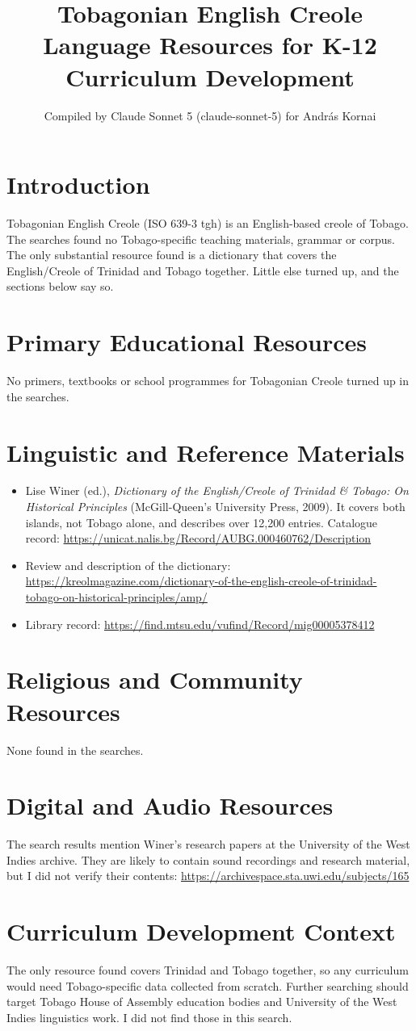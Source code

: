 \documentclass[12pt]{article}
\title{Tobagonian English Creole Language Resources for K-12 Curriculum Development}
\author{Compiled by Claude Sonnet 5 (claude-sonnet-5) for Andr\'as Kornai}
\date{}
\begin{document}
\maketitle

\section{Introduction}
Tobagonian English Creole (ISO 639-3 tgh) is an English-based creole of Tobago. The searches found no Tobago-specific teaching materials, grammar or corpus. The only substantial resource found is a dictionary that covers the English/Creole of Trinidad and Tobago together. Little else turned up, and the sections below say so.

\section{Primary Educational Resources}
No primers, textbooks or school programmes for Tobagonian Creole turned up in the searches.

\section{Linguistic and Reference Materials}
\begin{itemize}
\item Lise Winer (ed.), \emph{Dictionary of the English/Creole of Trinidad \& Tobago: On Historical Principles} (McGill-Queen's University Press, 2009). It covers both islands, not Tobago alone, and describes over 12,200 entries. Catalogue record: \url{https://unicat.nalis.bg/Record/AUBG.000460762/Description}
\item Review and description of the dictionary: \url{https://kreolmagazine.com/dictionary-of-the-english-creole-of-trinidad-tobago-on-historical-principles/amp/}
\item Library record: \url{https://find.mtsu.edu/vufind/Record/mig00005378412}
\end{itemize}

\section{Religious and Community Resources}
None found in the searches.

\section{Digital and Audio Resources}
The search results mention Winer's research papers at the University of the West Indies archive. They are likely to contain sound recordings and research material, but I did not verify their contents: \url{https://archivespace.sta.uwi.edu/subjects/165}

\section{Curriculum Development Context}
The only resource found covers Trinidad and Tobago together, so any curriculum would need Tobago-specific data collected from scratch. Further searching should target Tobago House of Assembly education bodies and University of the West Indies linguistics work. I did not find those in this search.
\end{document}
